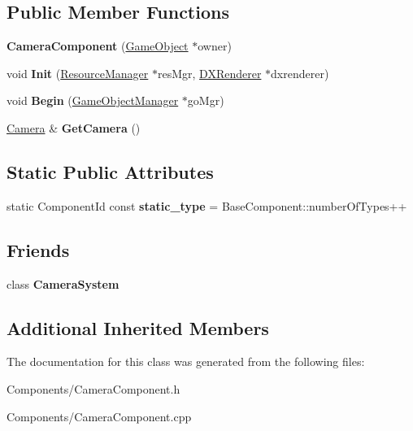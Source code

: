 \subsection*{Public Member Functions}
\begin{DoxyCompactItemize}
\item 
\mbox{\label{classCameraComponent_af29667817300732b1bf533ca8d1d3dee}} 
{\bfseries Camera\+Component} (\hyperlink{classGameObject}{Game\+Object} $\ast$owner)
\item 
\mbox{\label{classCameraComponent_ac1fd903a313d65bd8b7e8dcf7cab66b3}} 
void {\bfseries Init} (\hyperlink{classResourceManager}{Resource\+Manager} $\ast$res\+Mgr, \hyperlink{classDXRenderer}{D\+X\+Renderer} $\ast$dxrenderer)
\item 
\mbox{\label{classCameraComponent_a5cd6dd7439bfb54edb12b45abe32967c}} 
void {\bfseries Begin} (\hyperlink{classGameObjectManager}{Game\+Object\+Manager} $\ast$go\+Mgr)
\item 
\mbox{\label{classCameraComponent_a47d07609d9132a2ed72a52c2bf59874c}} 
\hyperlink{classCamera}{Camera} \& {\bfseries Get\+Camera} ()
\end{DoxyCompactItemize}
\subsection*{Static Public Attributes}
\begin{DoxyCompactItemize}
\item 
\mbox{\label{classCameraComponent_a8c3fa86b0056b2735e289e7a0d181ed7}} 
static Component\+Id const {\bfseries static\+\_\+type} = Base\+Component\+::number\+Of\+Types++
\end{DoxyCompactItemize}
\subsection*{Friends}
\begin{DoxyCompactItemize}
\item 
\mbox{\label{classCameraComponent_ace0f946b921a93dd4a83518b6bc7e40e}} 
class {\bfseries Camera\+System}
\end{DoxyCompactItemize}
\subsection*{Additional Inherited Members}


The documentation for this class was generated from the following files\+:\begin{DoxyCompactItemize}
\item 
Components/Camera\+Component.\+h\item 
Components/Camera\+Component.\+cpp\end{DoxyCompactItemize}
